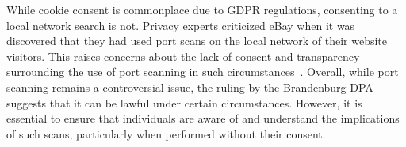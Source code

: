 While cookie consent is commonplace due to GDPR regulations, consenting to a local network search is not. Privacy experts criticized eBay when it was discovered that they had used port scans on the local network of their website visitors. This raises concerns about the lack of consent and transparency surrounding the use of port scanning in such circumstances~.
Overall, while port scanning remains a controversial issue, the ruling by the Brandenburg DPA suggests that it can be lawful under certain circumstances. However, it is essential to ensure that individuals are aware of and understand the implications of such scans, particularly when performed without their consent.